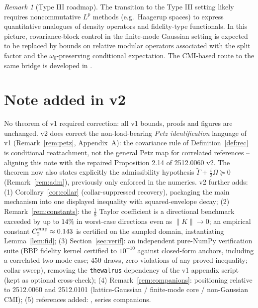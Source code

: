 \documentclass[11pt]{article}
\theoremstyle{remark}
\newtheorem{remark}[theorem]{Remark}
\begin{document}
\begin{remark}[Type III roadmap]
The transition to the Type III setting likely requires noncommutative
$L^p$ methods (e.g.\ Haagerup spaces) to express quantitative analogues of
density operators and fidelity-type functionals. In this picture,
covariance-block control in the finite-mode Gaussian setting is expected to
be replaced by bounds on relative modular operators associated with the
split factor and the $\omega_0$-preserving conditional expectation. The
CMI-based route to the same bridge is developed in \cite{S0101}.
\end{remark}

\section*{Note added in v2}
No theorem of v1 required correction: all v1 bounds, proofs and figures are
unchanged. v2 does correct the non-load-bearing \emph{Petz identification}
language of v1 (Remark~\ref{rem:petz}, Appendix~A): the covariance rule of
Definition~\ref{def:rec} is conditional reattachment, not the general Petz
map for correlated references -- aligning this note with the repaired
Proposition 2.14 of 2512.0060 v2. The theorem now also states explicitly
the admissibility hypothesis $\tilde\Gamma + \frac{i}{2}\Omega \succeq 0$
(Remark~\ref{rem:adm}), previously only enforced in the numerics. v2
further adds:
(1) Corollary~\ref{cor:collar} (collar-suppressed recovery), packaging the
main mechanism into one displayed inequality with squared-envelope decay;
(2) Remark~\ref{rem:constants}: the $\tfrac18$ Taylor coefficient is a
directional benchmark exceeded by up to $14\%$ in worst-case directions
even as $\|K\| \to 0$; an empirical constant $C_2^{\rm emp} \approx 0.143$
is certified on the sampled domain, instantiating Lemma~\ref{lem:fid};
(3) Section~\ref{sec:verif}: an independent pure-NumPy verification suite
(BBP fidelity kernel certified to $10^{-10}$ against closed-form anchors,
including a correlated two-mode case; 450 draws, zero violations of any
proved inequality; collar sweep), removing the \texttt{thewalrus}
dependency of the v1 appendix script (kept as optional cross-check);
(4) Remark~\ref{rem:companions}: positioning relative to 2512.0060 and
2512.0101 (lattice-Gaussian / finite-mode core / non-Gaussian CMI);
(5) references added: \cite{Marian}, series companions.

\appendix
\end{document}
